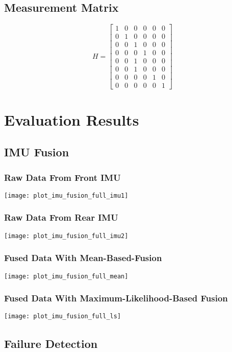 \section{Measurement Matrix}\label{sec:appendix-ekf-measurement}
\begin{equation*}%
H = \begin{bmatrix}%
1 & 0 & 0 & 0 & 0 & 0 \\%
0 & 1 & 0 & 0 & 0 & 0 \\%
0 & 0 & 1 & 0 & 0 & 0 \\%
0 & 0 & 0 & 1 & 0 & 0 \\%
0 & 0 & 1 & 0 & 0 & 0 \\%
0 & 0 & 1 & 0 & 0 & 0 \\%
0 & 0 & 0 & 0 & 1 & 0 \\%
0 & 0 & 0 & 0 & 0 & 1%
\end{bmatrix}%
\end{equation*}

\chapter{Evaluation Results}

\section{IMU Fusion}\label{sec:appendix-imufusion}
\subsection{Raw Data From Front IMU}
\texttt{[image: plot\_imu\_fusion\_full\_imu1]}
\subsection{Raw Data From Rear IMU}
\texttt{[image: plot\_imu\_fusion\_full\_imu2]}
\subsection{Fused Data With Mean-Based-Fusion}
\texttt{[image: plot\_imu\_fusion\_full\_mean]}
\subsection{Fused Data With Maximum-Likelihood-Based Fusion}
\texttt{[image: plot\_imu\_fusion\_full\_ls]}

\section{Failure Detection}\label{sec:appendix-failure-detection}
